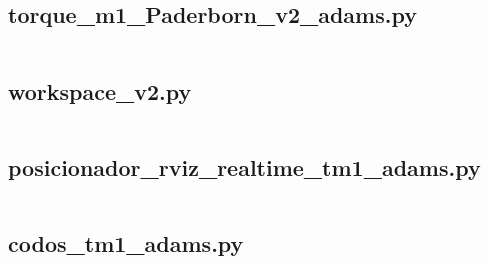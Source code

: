         \subsection{torque\_m1\_Paderborn\_v2\_adams.py}
        {\footnotesize 
            \inputminted{python}{Back/codigos_py/torque_m1_Paderborn_v2_adams.py}
            }
        \newpage    
        
        \subsection{workspace\_v2.py}
        {\footnotesize 
            \inputminted{python}{Back/codigos_py/workspace_v2.py}
            }
        \newpage   
        
        \subsection{posicionador\_rviz\_realtime\_tm1\_adams.py}
        {\footnotesize 
            \inputminted{python}{Back/codigos_py/posicionador_rviz_realtime_tm1_adams.py}
            }
        \newpage  
        
        \subsection{codos\_tm1\_adams.py}
        {\footnotesize 
            \inputminted{python}{Back/codigos_py/codos_tm1_adams.py}
            }
        \newpage   